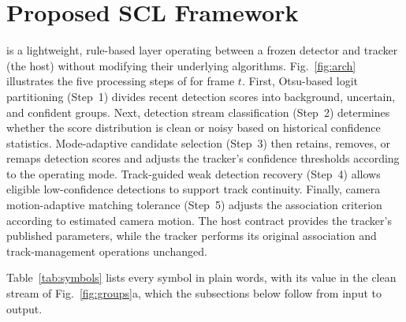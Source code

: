 \section{Proposed SCL Framework}\label{sec:method}

\scl{} is a lightweight, rule-based layer operating between a frozen detector and tracker (the
host) without modifying their underlying algorithms. Fig.~\ref{fig:arch} illustrates the five
processing steps of \scl{} for frame $t$. First, Otsu-based logit partitioning (Step~1) divides
recent detection scores into background, uncertain, and confident groups. Next, detection stream
classification (Step~2) determines whether the score distribution is clean or noisy based on
historical confidence statistics. Mode-adaptive candidate selection (Step~3) then retains,
removes, or remaps detection scores and adjusts the tracker's confidence thresholds according to
the operating mode. Track-guided weak detection recovery (Step~4) allows eligible low-confidence
detections to support track continuity. Finally, camera motion-adaptive matching tolerance
(Step~5) adjusts the association criterion according to estimated camera motion. The host
contract provides the tracker's published parameters, while the tracker performs its original
association and track-management operations unchanged.

Table~\ref{tab:symbols} lists every symbol in plain words, with its value in the clean stream of
Fig.~\ref{fig:groups}a, which the subsections below follow from input to output.



